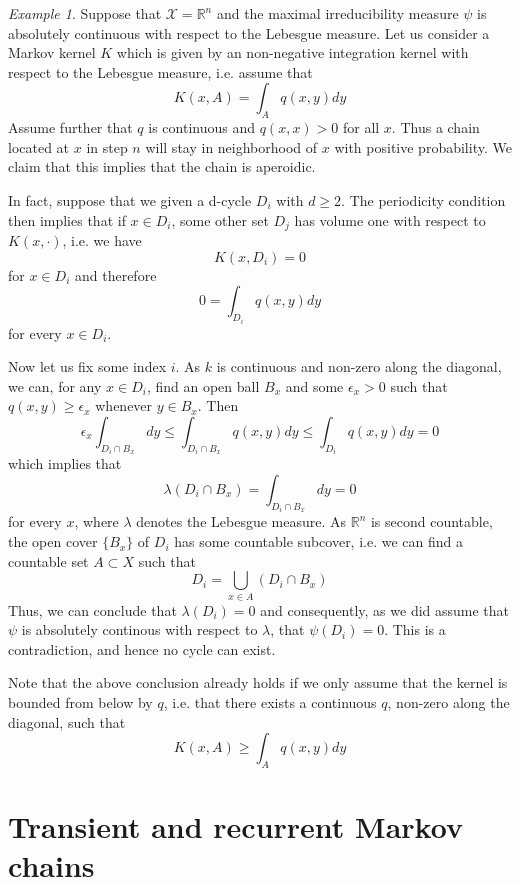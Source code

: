 \documentclass[a4paper, draft]{article}
\theoremstyle{own}
\theoremstyle{remark}
\newtheorem{example}{Example}[section]
\newcommand{\R}{\mathbb{R}}
\begin{document}
\begin{example}\label{ex:aperiodintegrationkernel}
	Suppose that ${\mathcal X} = \R^n$ and the maximal irreducibility measure $\psi$ is absolutely continuous with respect to the Lebesgue measure. Let us consider a Markov kernel $K$ which is given by an non-negative integration kernel with respect to the Lebesgue measure, i.e. assume that
	$$
	K(x,A) = \int_A q(x,y) dy
	$$
	Assume further that $q$ is continuous and $q(x,x) > 0$ for all $x$. Thus a chain located at $x$ in step $n$ will stay in neighborhood of $x$ with positive probability. We claim that this implies that the chain is aperoidic.
	
	In fact, suppose that we given a d-cycle $D_i$ with $d \geq 2$.  The periodicity condition then implies that  if $x \in D_i$, some other set $D_j$ has volume one with respect to $K(x,\cdot)$, i.e. we have
	$$
	K(x,D_i) = 0
	$$
	for $x \in D_i$ and therefore
	$$
	0 = \int_{D_i} q(x,y) dy
	$$
	for every $x \in D_i$. 
	
	Now let us fix some index $i$. As $k$ is continuous and non-zero along the diagonal, we can, for any $x \in D_i$, find an open ball $B_x$ and some $\epsilon_x > 0$ such that $q(x,y) \geq \epsilon_x$ whenever $y \in B_x$. Then
	$$
	\epsilon_x \int_{D_i \cap B_x} dy \leq \int_{D_i \cap B_x} q(x,y) dy \leq \int_{D_i} q(x,y) dy = 0
	$$
	which implies that 
	$$
	\lambda(D_i \cap B_x) = \int_{D_i \cap B_x} dy = 0
	$$ 
	for every $x$, where $\lambda$ denotes the Lebesgue measure. As $\R^n$ is second countable, the open cover $\{B_x \}$ of $D_i$ has some countable subcover, i.e. we can find a countable set $A \subset X$ such that
	$$
	D_i = \bigcup_{x \in A} (D_i \cap B_x)
	$$
	Thus, we can conclude that $\lambda(D_i) = 0$ and consequently, as we did assume that $\psi$ is absolutely continous with respect to $\lambda$, that $\psi(D_i) = 0$. This is a contradiction, and hence no cycle can exist.
	
	Note that the above conclusion already holds if we only assume that the kernel is bounded from below by $q$, i.e. that there exists a continuous $q$, non-zero along the diagonal, such that
	$$
	K(x,A) \geq \int_A q(x,y) dy
	$$
\end{example}

\section{Transient and recurrent Markov chains}
\label{sec:transientandrecurrentmarkovchains}
\end{document}
